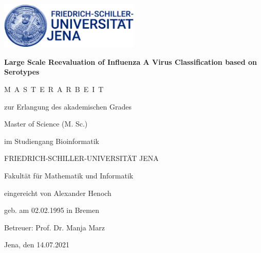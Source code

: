 \begin{titlepage}
    
    \centering 
    \large
    \includegraphics[width=0.5\textwidth]{Graphics/Logo.jpg}

    \vspace{5em}

    {\Large \textbf{Large Scale Reevaluation of Influenza A Virus Classification based on Serotypes}}
    
    \vspace{5em}
    
    M~A~S~T~E~R~A~R~B~E~I~T
    
    \vspace{1em}
    
    zur Erlangung des akademischen Grades
    
    \vspace{1em}
    
    Master of Science (M. Sc.)
    
    im Studiengang Bioinformatik
    
    \vspace{1em}
    
    FRIEDRICH-SCHILLER-UNIVERSITÄT JENA
    
    Fakultät für Mathematik und Informatik
    
    \vfill
    
    eingereicht von Alexander Henoch
    
    geb. am 02.02.1995 in Bremen
    
    \vspace{1em}
    
    Betreuer: Prof. Dr. Manja Marz
    
    \vspace{1em}
    
    Jena, den 14.07.2021
    
\end{titlepage}
